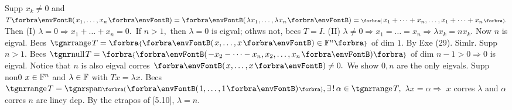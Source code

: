 %


Supp $x_k\neq 0$ and $T\Par{x_1,\dots,x_n}=\Par{\lambda x_1,\dots,\lambda x_n}=\BigPar{x_1+\dots+x_n,\dots,x_1+\dots+x_n}.$\parSol{}
Then (I) $\lambda=0\Rightarrow x_1+\dots+x_n=0.$ \,If $n>1,$ then $\lambda=0$ is eigval; othws not, becs $T=I.$\parSol{}
(II) $\lambda\neq 0\Rightarrow x_1=\dots=x_n\Rightarrow\lambda x_k=n x_k.$ Now $n$ is eigval.\PfEnd\vspace{2pt}\parSol{}
\Or Becs $\range T=\Bra{\Par{x,\dots,x}\in\Fbb^n}$ of dim $1.$ By Exe (29). Simlr.\PfEnd\parSol{}
\Or Supp $n>1.$ Becs $\null T=\Bra{\Par{{-x_2-\dots-x_n,x_2,\dots,x_n}}}$ of dim $n-1>0\Rightarrow 0$ is eigval.\parSol{}
Notice that $n$ is also eigval corres $\Par{x,\dots,x}\neq 0.$ We show $0,n$ are the only eigvals.\parSol{}
Supp non0 $x\in{\mathbb{F}}^n$ and $\lambda\in{\mathbb{F}}$ with $Tx=\lambda x.$ Becs $\range T=\Span[\BigPar]{\Par{1,\dots,1}},\exists\,!\,\alpha\in\range T,$\parSol{}
$\lambda x=\alpha\Rightarrow$ $x$ corres $\lambda$ and $\alpha$ corres $n$ are liney dep. By the ctrapos of [5.10], $\lambda=n.$\PfEnd
\SepLine\pagebreak

